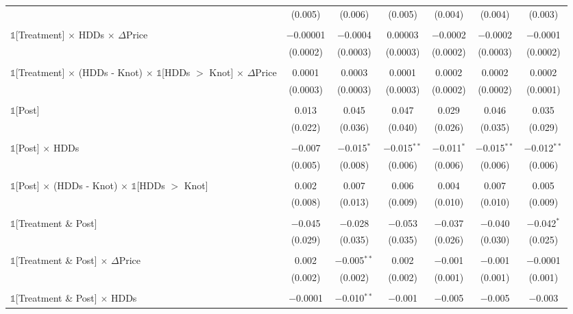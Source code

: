 \begin{table}[!htbp]
\begin{longtable}{@{\extracolsep{15pt}}lcccccc}
  & (0.005) & (0.006) & (0.005) & (0.004) & (0.004) & (0.003) \\ 
  & & & & & & \\ 
 $\mathbb{1}$[Treatment] $\times$ HDDs $\times$ $\Delta$Price & $-$0.00001 & $-$0.0004 & 0.00003 & $-$0.0002 & $-$0.0002 & $-$0.0001 \\ 
  & (0.0002) & (0.0003) & (0.0003) & (0.0002) & (0.0003) & (0.0002) \\ 
  & & & & & & \\ 
 $\mathbb{1}$[Treatment] $\times$ (HDDs - Knot) $\times$ $\mathbb{1}$[HDDs $>$ Knot] $\times$ $\Delta$Price & 0.0001 & 0.0003 & 0.0001 & 0.0002 & 0.0002 & 0.0002 \\ 
  & (0.0003) & (0.0003) & (0.0003) & (0.0002) & (0.0002) & (0.0001) \\ 
  & & & & & & \\ 
 $\mathbb{1}$[Post] & 0.013 & 0.045 & 0.047 & 0.029 & 0.046 & 0.035 \\ 
  & (0.022) & (0.036) & (0.040) & (0.026) & (0.035) & (0.029) \\ 
  & & & & & & \\ 
 $\mathbb{1}$[Post] $\times$ HDDs & $-$0.007 & $-$0.015$^{*}$ & $-$0.015$^{**}$ & $-$0.011$^{*}$ & $-$0.015$^{**}$ & $-$0.012$^{**}$ \\ 
  & (0.005) & (0.008) & (0.006) & (0.006) & (0.006) & (0.006) \\ 
  & & & & & & \\ 
 $\mathbb{1}$[Post] $\times$ (HDDs - Knot) $\times$ $\mathbb{1}$[HDDs $>$ Knot] & 0.002 & 0.007 & 0.006 & 0.004 & 0.007 & 0.005 \\ 
  & (0.008) & (0.013) & (0.009) & (0.010) & (0.010) & (0.009) \\ 
  & & & & & & \\ 
 $\mathbb{1}$[Treatment \& Post] & $-$0.045 & $-$0.028 & $-$0.053 & $-$0.037 & $-$0.040 & $-$0.042$^{*}$ \\ 
  & (0.029) & (0.035) & (0.035) & (0.026) & (0.030) & (0.025) \\ 
  & & & & & & \\ 
 $\mathbb{1}$[Treatment \& Post] $\times$ $\Delta$Price & 0.002 & $-$0.005$^{**}$ & 0.002 & $-$0.001 & $-$0.001 & $-$0.0001 \\ 
  & (0.002) & (0.002) & (0.002) & (0.001) & (0.001) & (0.001) \\ 
  & & & & & & \\ 
 $\mathbb{1}$[Treatment \& Post] $\times$ HDDs & $-$0.0001 & $-$0.010$^{**}$ & $-$0.001 & $-$0.005 & $-$0.005 & $-$0.003 \\ 

\end{longtable}
\end{table}
